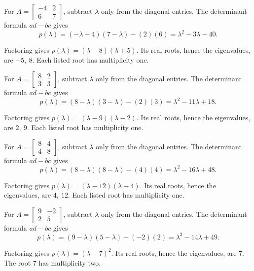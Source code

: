 For $A=\begin{bmatrix}-4 & 2\\6 & 7\end{bmatrix}$, subtract $\lambda$ only from the diagonal entries. The determinant formula $ad-bc$ gives
\[ p(\lambda)=(- \lambda - 4)(7 - \lambda)-(2)(6)=\lambda^{2} - 3 \lambda - 40.\]

Factoring gives $p(\lambda)=\left(\lambda - 8\right) \left(\lambda + 5\right)$. Its real roots, hence the eigenvalues, are $-5,\ 8$. Each listed root has multiplicity one.

For $A=\begin{bmatrix}8 & 2\\3 & 3\end{bmatrix}$, subtract $\lambda$ only from the diagonal entries. The determinant formula $ad-bc$ gives
\[ p(\lambda)=(8 - \lambda)(3 - \lambda)-(2)(3)=\lambda^{2} - 11 \lambda + 18.\]

Factoring gives $p(\lambda)=\left(\lambda - 9\right) \left(\lambda - 2\right)$. Its real roots, hence the eigenvalues, are $2,\ 9$. Each listed root has multiplicity one.

For $A=\begin{bmatrix}8 & 4\\4 & 8\end{bmatrix}$, subtract $\lambda$ only from the diagonal entries. The determinant formula $ad-bc$ gives
\[ p(\lambda)=(8 - \lambda)(8 - \lambda)-(4)(4)=\lambda^{2} - 16 \lambda + 48.\]

Factoring gives $p(\lambda)=\left(\lambda - 12\right) \left(\lambda - 4\right)$. Its real roots, hence the eigenvalues, are $4,\ 12$. Each listed root has multiplicity one.

For $A=\begin{bmatrix}9 & -2\\2 & 5\end{bmatrix}$, subtract $\lambda$ only from the diagonal entries. The determinant formula $ad-bc$ gives
\[ p(\lambda)=(9 - \lambda)(5 - \lambda)-(-2)(2)=\lambda^{2} - 14 \lambda + 49.\]

Factoring gives $p(\lambda)=\left(\lambda - 7\right)^{2}$. Its real roots, hence the eigenvalues, are $7$. The root $7$ has multiplicity two.

